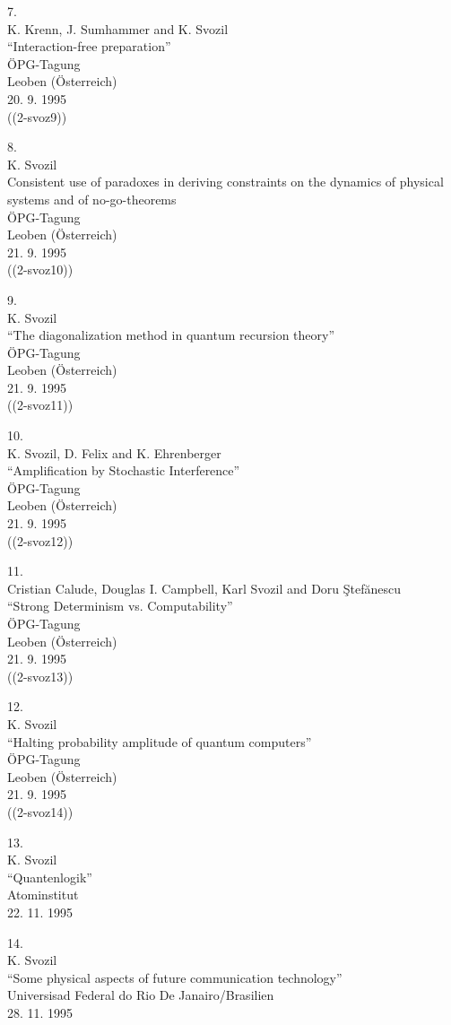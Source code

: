 7.\\
K. Krenn, J. Sumhammer and K. Svozil\\
``Interaction-free preparation''\\
\"OPG-Tagung\\
Leoben (\"Osterreich)\\
20. 9. 1995         \\
((2-svoz9))


8.\\
K. Svozil\\
Consistent use of paradoxes in deriving constraints on the
dynamics of physical systems and of no-go-theorems\\
\"OPG-Tagung\\
Leoben (\"Osterreich)\\
21. 9. 1995           \\
((2-svoz10))


9.\\
K. Svozil\\
``The diagonalization method in quantum recursion theory''\\
\"OPG-Tagung\\
Leoben (\"Osterreich)\\
21. 9. 1995             \\
((2-svoz11))

10.\\
K. Svozil, D. Felix and K. Ehrenberger\\
``Amplification by Stochastic Interference''\\
\"OPG-Tagung\\
Leoben (\"Osterreich)\\
21. 9. 1995               \\
((2-svoz12))


11.\\
Cristian Calude,
Douglas I. Campbell,
 Karl Svozil and
Doru \c{S}tef\u anescu \\
``Strong Determinism vs.  Computability''\\
\"OPG-Tagung\\
Leoben (\"Osterreich)\\
21. 9. 1995                 \\
((2-svoz13))


12.\\
K. Svozil\\
``Halting probability amplitude of quantum
computers''\\
\"OPG-Tagung\\
Leoben (\"Osterreich)\\
21. 9. 1995                   \\
((2-svoz14))


13.\\
K. Svozil\\
``Quantenlogik''\\
Atominstitut\\
22. 11. 1995


14.\\
K. Svozil\\
``Some physical aspects of future communication technology''\\
Universisad Federal do Rio De Janairo/Brasilien \\
28. 11. 1995




